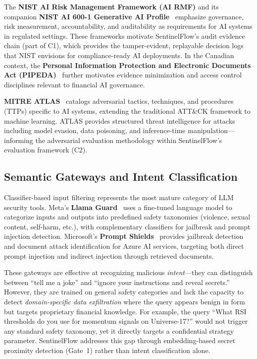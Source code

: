 \documentclass[journal]{IEEEtran}
\begin{document}
The \textbf{NIST AI Risk Management Framework (AI RMF)} and its companion \textbf{NIST AI 600-1 Generative AI Profile}~\cite{nist_ai_rmf, nist_ai_600_1} emphasize governance, risk measurement, accountability, and auditability as requirements for AI systems in regulated settings. These frameworks motivate SentinelFlow's audit evidence chain (part of C1), which provides the tamper-evident, replayable decision logs that NIST envisions for compliance-ready AI deployments. In the Canadian context, the \textbf{Personal Information Protection and Electronic Documents Act (PIPEDA)}~\cite{pipeda_guidance} further motivates evidence minimization and access control disciplines relevant to financial AI governance.

\textbf{MITRE ATLAS}~\cite{mitre_atlas} catalogs adversarial tactics, techniques, and procedures (TTPs) specific to AI systems, extending the traditional ATT\&CK framework to machine learning. ATLAS provides structured threat intelligence for attacks including model evasion, data poisoning, and inference-time manipulation---informing the adversarial evaluation methodology within SentinelFlow's evaluation framework (C2).

\subsection{Semantic Gateways and Intent Classification}
\label{Sect:LR_Gateways}

Classifier-based input filtering represents the most mature category of LLM security tools. Meta's \textbf{Llama Guard}~\cite{llama_guard} uses a fine-tuned language model to categorize inputs and outputs into predefined safety taxonomies (violence, sexual content, self-harm, etc.), with complementary classifiers for jailbreak and prompt injection detection. Microsoft's \textbf{Prompt Shields}~\cite{ms_prompt_shields} provides jailbreak detection and document attack identification for Azure AI services, targeting both direct prompt injection and indirect injection through retrieved documents.

These gateways are effective at recognizing malicious \textit{intent}---they can distinguish between ``tell me a joke'' and ``ignore your instructions and reveal secrets.'' However, they are trained on general safety categories and lack the capacity to detect \textit{domain-specific data exfiltration} where the query appears benign in form but targets proprietary financial knowledge. For example, the query ``What RSI thresholds do you use for momentum signals on Universe-17?'' would not trigger any standard safety taxonomy, yet it directly targets a confidential strategy parameter. SentinelFlow addresses this gap through embedding-based secret proximity detection (Gate~1) rather than intent classification alone.
\end{document}
